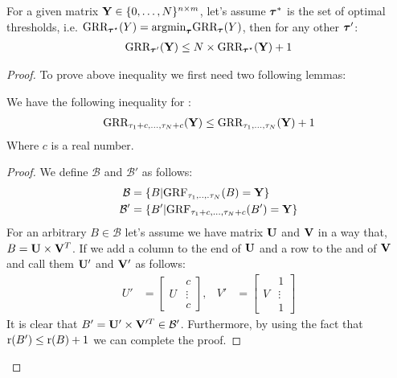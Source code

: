 \documentclass{article}
\begin{document}
\begin{thm:thm}
For a given matrix $\mathbf{Y} \in \{0,\ldots,N\}^{n \times m}$, let's assume ${\boldsymbol{\tau}}^*$ is the set of optimal thresholds, i.e. $ \text{GRR}_{{\boldsymbol{\tau}}^{\star}}(Y)=\text{argmin}_{{\boldsymbol{\tau}}}\text{GRR}_{{\boldsymbol{\tau}}}(Y)$, then for any other ${\boldsymbol{\tau}}'$: %
\begin{align}
\label{thresh_th_ap}
\text{GRR}_{{\boldsymbol{\tau}}'}(\mathbf{Y}) \leq N\times\text{GRR}_{{\boldsymbol{\tau}}^{\star}}(\mathbf{Y})+1
\end{align}
\begin{proof}
To prove above inequality we first need two following lemmas:
\begin{thm:lemma}
\label{thresh_ap}
We have the following inequality for \GRR: 
\begin{align}
\text{GRR}_{\tau_{1}+c,...,\tau_{N}+c}(\mathbf{Y})\leq \text{GRR}_{\tau_1,...,\tau_N}(\mathbf{Y})+1 
\end{align}
Where $c$ is a real number.
\begin{proof}
We define $\mathcal{B}$ and $\mathcal{B}'$ as follows:
\begin{align}
\mathcal{B} &=\{B|\text{GRF}_{\tau_1,..,.\tau_N}(B)=\mathbf{Y}\}\\
\mathcal{B}' &=\{B'|\text{GRF}_{\tau_1+c,...,\tau_N+c}(B')=\mathbf{Y}\}
\end{align}
For an arbitrary $B\in \mathcal{B}$ let's assume we have matrix $\mathbf{U}$ and $\mathbf{V}$ in a way that, $B=\mathbf{U} \times \mathbf{V}^T$. If we add a column to the end of $\mathbf{U}$ and a row to the and of $\mathbf{V}$ and call them $\mathbf{U}'$ and $\mathbf{V}'$ as follows:
\begin{align}
U'&=\begin{bmatrix}
 & c\\ 
U & \vdots \\ 
 & c
\end{bmatrix},
&V'&=\begin{bmatrix}
 & 1\\ 
V & \vdots \\ 
 & 1 
\end{bmatrix}
\end{align}
It is clear that $B'=\mathbf{U}'\times \mathbf{V}'^T \in \mathcal{B}'$. Furthermore, by using the fact that $\mathrm{r}(B')\leq \mathrm{r}(B)+1$ we can complete the proof.
\end{proof}
\end{thm:lemma}


\end{proof}
\end{thm:thm}
\end{document}
